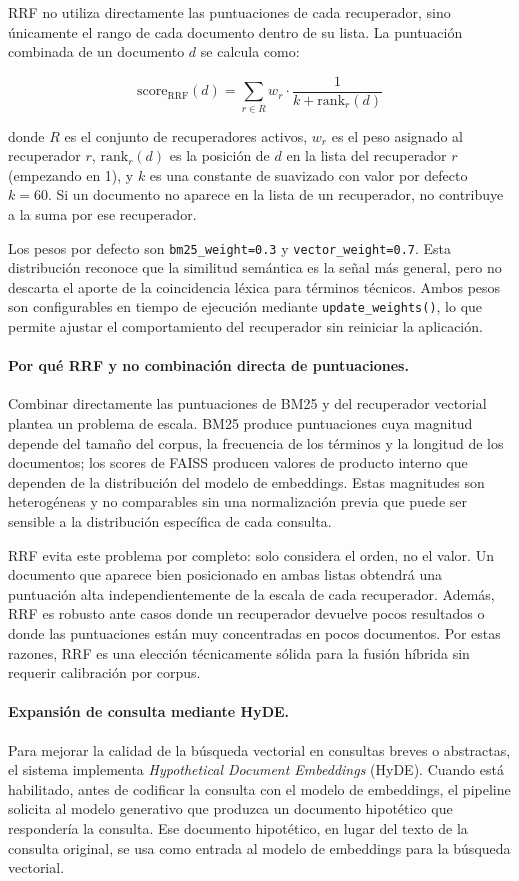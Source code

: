 \documentclass[11pt]{article}
\begin{document}
RRF no utiliza directamente las puntuaciones de cada recuperador, sino únicamente el rango de
cada documento dentro de su lista. La puntuación combinada de un documento $d$ se calcula como:

\[
\mathrm{score}_{\mathrm{RRF}}(d) =
\sum_{r \in R}
w_r \cdot \frac{1}{k + \mathrm{rank}_r(d)}
\]

donde $R$ es el conjunto de recuperadores activos, $w_r$ es el peso asignado al recuperador $r$,
$\mathrm{rank}_r(d)$ es la posición de $d$ en la lista del recuperador $r$ (empezando en 1), y
$k$ es una constante de suavizado con valor por defecto $k=60$. Si un documento no aparece en
la lista de un recuperador, no contribuye a la suma por ese recuperador.

Los pesos por defecto son \texttt{bm25\_weight=0.3} y \texttt{vector\_weight=0.7}. Esta
distribución reconoce que la similitud semántica es la señal más general, pero no descarta el
aporte de la coincidencia léxica para términos técnicos. Ambos pesos son configurables en tiempo
de ejecución mediante \texttt{update\_weights()}, lo que permite ajustar el comportamiento del
recuperador sin reiniciar la aplicación.

\paragraph{Por qué RRF y no combinación directa de puntuaciones.}
Combinar directamente las puntuaciones de BM25 y del recuperador vectorial plantea un problema
de escala. BM25 produce puntuaciones cuya magnitud depende del tamaño del corpus, la frecuencia
de los términos y la longitud de los documentos; los scores de FAISS producen valores de producto
interno que dependen de la distribución del modelo de embeddings. Estas magnitudes son
heterogéneas y no comparables sin una normalización previa que puede ser sensible a la
distribución específica de cada consulta.

RRF evita este problema por completo: solo considera el orden, no el valor. Un documento que
aparece bien posicionado en ambas listas obtendrá una puntuación alta independientemente de la
escala de cada recuperador. Además, RRF es robusto ante casos donde un recuperador devuelve
pocos resultados o donde las puntuaciones están muy concentradas en pocos documentos. Por estas
razones, RRF es una elección técnicamente sólida para la fusión híbrida sin requerir calibración
por corpus.

\paragraph{Expansión de consulta mediante HyDE.}
Para mejorar la calidad de la búsqueda vectorial en consultas breves o abstractas, el sistema
implementa \emph{Hypothetical Document Embeddings} (HyDE). Cuando está habilitado, antes de
codificar la consulta con el modelo de embeddings, el pipeline solicita al modelo generativo que
produzca un documento hipotético que respondería la consulta. Ese documento hipotético, en lugar
del texto de la consulta original, se usa como entrada al modelo de embeddings para la búsqueda
vectorial.
\end{document}
